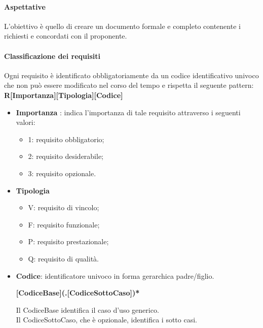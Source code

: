 \paragraph{Aspettative}
L'obiettivo è quello di creare un documento formale e completo contenente i  richiesti e concordati con il proponente.

\paragraph{Classificazione dei requisiti} \label{_classificazioneRequisiti}
Ogni requisito è identificato obbligatoriamente da un codice identificativo univoco che non può essere modificato nel corso del tempo e rispetta il seguente pattern: \\
\textbf{R[Importanza][Tipologia][Codice]}

\begin{itemize}
  \item 	\textbf{Importanza} : indica l'importanza di tale requisito attraverso i seguenti valori:
        \begin{itemize}
          \item 1: requisito obbligatorio;
          \item 2: requisito desiderabile;
          \item 3: requisito opzionale.
        \end{itemize}
  \item \textbf{Tipologia}
        \begin{itemize}
          \item V: requisito di vincolo;
          \item F: requisito funzionale;
          \item P: requisito prestazionale;
          \item Q: requisito di qualità.
        \end{itemize}
  \item \textbf{Codice}: identificatore univoco in forma gerarchica padre/figlio.
        \begin{center}
          \textbf{[CodiceBase](.[CodiceSottoCaso])*} \\
        \end{center}


        Il CodiceBase identifica il caso d'uso generico. \\
        Il CodiceSottoCaso, che è opzionale, identifica i sotto casi.
\end{itemize}


